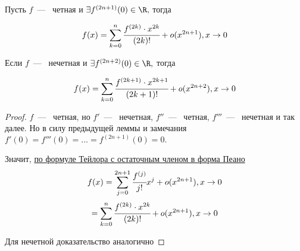 \begin{lemma}
	Пусть $f$~---~ четная и $\exists f^{(2n + 1)}(0) \in \R,$ тогда 
	
	$$f(x) = \sum\limits_{k = 0}^{n} \cfrac{f^{(2k)} \cdot x^{2k}}{(2k)!} + o(x^{2n+1}), x\to 0$$ 
	
	Если $f$~---~ нечетная и $\exists f^{(2n + 2)}(0) \in \R,$ тогда 
	
	$$f(x) = \sum\limits_{k = 0}^{n} \cfrac{f^{(2k+1)} \cdot x^{2k+1}}{(2k+1)!} + o(x^{2n+2}), x\to 0$$ 
\end{lemma}
\begin{proof}
	$f$~---~ четная, но $f'$~---~ нечетная, $f''$~---~ четная, $f'''$~---~ нечетная и так далее. Но в силу предыдущей леммы и замечания $f'(0) = f'''(0) = \ldots = f^{(2n+1)}(0) = 0.$ 
	
	Значит, \hyperlink{thrm5.14}{по формуле Тейлора с остаточным членом в форма Пеано} $$f(x) = \sum\limits_{j = 0}^{2n+1} \cfrac{f^{(j)}}{j!} x^{j} + o(x^{2n+1}), x\to 0$$
	$$= \sum\limits_{k = 0}^{n} \cfrac{f^{(2k)} \cdot x^{2k}}{(2k)!} + o(x^{2n+1}), x\to 0$$
	
	Для нечетной доказательство аналогично
\end{proof}


